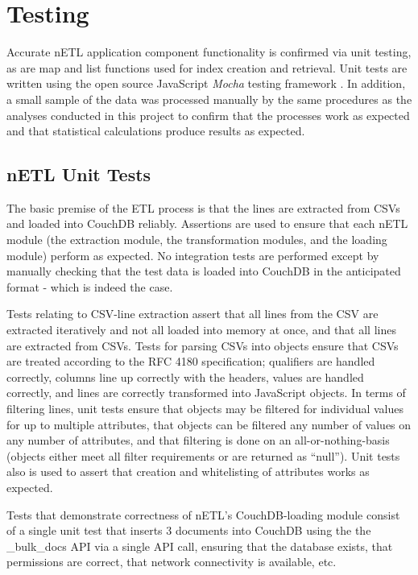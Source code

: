 \section{Testing}
Accurate nETL application component functionality is confirmed via unit testing, as are map and list functions used for index creation and retrieval. Unit tests are written using the open source JavaScript \textit{Mocha} testing framework \cite{mochaTest}. In addition, a small sample of the data was processed manually by the same procedures as the analyses conducted in this project to confirm that the processes work as expected and that statistical calculations produce results as expected.

\subsection{nETL Unit Tests}
The basic premise of the ETL process is that the lines are extracted from CSVs and loaded into CouchDB reliably. Assertions are used to ensure that each nETL module (the extraction module, the transformation modules, and the loading module) perform as expected. No integration tests are performed except by manually checking that the test data is loaded into CouchDB in the anticipated format - which is indeed the case.

Tests relating to CSV-line extraction assert that all lines from the CSV are extracted iteratively and not all loaded into memory at once, and that all lines are extracted from CSVs. Tests for parsing CSVs into objects ensure that CSVs are treated according to the RFC 4180 specification; qualifiers are handled correctly, columns line up correctly with the headers, values are handled correctly, and lines are correctly transformed into JavaScript objects. In terms of filtering lines, unit tests ensure that objects may be filtered for individual values for up to multiple attributes, that objects can be filtered any number of values on any number of attributes, and that filtering is done on an all-or-nothing-basis (objects either meet all filter requirements or are returned as ``null''). Unit tests also is used to assert that creation and whitelisting of attributes works as expected.

Tests that demonstrate correctness of nETL's CouchDB-loading module consist of a single unit test that inserts 3 documents into CouchDB using the the \_bulk\_docs API via a single API call, ensuring that the database exists, that permissions are correct, that network connectivity is available, etc.

